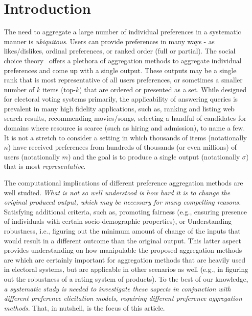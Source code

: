 \documentclass[11pt]{article}
\begin{document}
\section{Introduction}
\vspace{-0.1in}
The need to aggregate a large number of individual preferences in a  systematic manner is {\em ubiquitous}. Users can provide preferences in many ways - as likes/dislikes, ordinal preferences, or ranked order (full or partial). The social choice theory~\cite{feldman2006welfare} offers a plethora of aggregation methods to aggregate individual preferences and come up with a single output. These outputs may be a single rank that is most representative of all users preferences, or sometimes a smaller number of $k$ items (top-$k$) that are ordered or  presented as a set. While  designed for electoral voting systems primarily, the applicability of answering queries is prevalent in many high fidelity applications, such as, ranking and listing web search results, recommending movies/songs,  selecting a handful of candidates for domains where resource is scarce (such as hiring and admission), to name a few. It is not a stretch to consider a setting in which thousands of items (notationally $n$) have received preferences from hundreds of thousands (or even millions) of users (notationally $m$) and the goal is to produce a single output (notationally $\sigma$) that is most {\em representative}. 



The computational implications of different preference aggregation methods are well studied. {\em What is not so well understood is how hard it is to change the original produced output, which may be necessary for many compelling reasons.}  Satisfying additional criteria, such as, promoting fairness (e.g., ensuring presence of individuals with certain socio-demographic properties),  or Understanding robustness, i.e., figuring out the minimum amount of change of the inputs that would result in a different outcome than the original output. This latter aspect provides understanding on how manipulable the proposed aggregation methods are which are certainly important for aggregation methods that are heavily used in electoral systems, but are applicable in other scenarios as well (e.g., in figuring out the robustness of a rating system of products). To the best of our knowledge, {\em a systematic study is needed to investigate these aspects in conjunction with different preference elicitation models, requiring different preference aggregation methods.} That, in nutshell, is the focus of this article.
\end{document}
